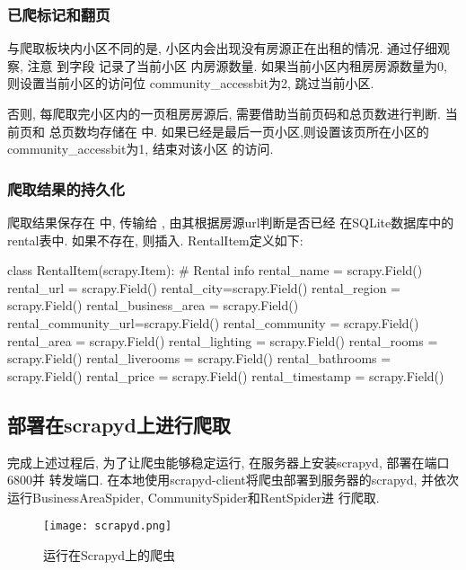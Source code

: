 \subsubsection{已爬标记和翻页}
与爬取板块内小区不同的是, 小区内会出现没有房源正在出租的情况. 通过仔细观察, 注意
到字段  记录了当前小区
内房源数量. 如果当前小区内租房房源数量为0, 则设置当前小区的访问位
community\_accessbit为2, 跳过当前小区.

否则, 每爬取完小区内的一页租房房源后, 需要借助当前页码和总页数进行判断. 当前页和
总页数均存储在 中.
如果已经是最后一页小区,则设置该页所在小区的community\_accessbit为1, 结束对该小区
的访问.

\subsubsection{爬取结果的持久化}
爬取结果保存在 中, 传输给
, 由其根据房源url判断是否已经
在SQLite数据库中的rental表中. 如果不存在, 则插入. RentalItem定义如下:
\begin{python}
    class RentalItem(scrapy.Item):
    # Rental info
    rental_name = scrapy.Field()
    rental_url = scrapy.Field()
    rental_city=scrapy.Field()
    rental_region = scrapy.Field()
    rental_business_area = scrapy.Field()
    rental_community_url=scrapy.Field()
    rental_community = scrapy.Field()
    rental_area = scrapy.Field()
    rental_lighting = scrapy.Field()
    rental_rooms = scrapy.Field()
    rental_liverooms = scrapy.Field()
    rental_bathrooms = scrapy.Field()
    rental_price = scrapy.Field()
    rental_timestamp = scrapy.Field()
\end{python}

\subsection{部署在scrapyd上进行爬取}
完成上述过程后, 为了让爬虫能够稳定运行, 在服务器上安装scrapyd, 部署在端口6800并
转发端口. 在本地使用scrapyd-client将爬虫部署到服务器的scrapyd, 并依次运行BusinessAreaSpider, CommunitySpider和RentSpider进
行爬取.
\begin{figure}[ht!]
    \centering
    \texttt{[image: scrapyd.png]}
    \caption{运行在Scrapyd上的爬虫}
    \label{fig:运行在Scrapyd上的爬虫}
\end{figure}